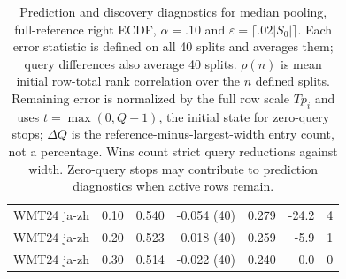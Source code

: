 \begin{table}[t]
\begin{tabular}{lrrrrrr}
WMT24 ja-zh & 0.10 & 0.540 & -0.054 (40) & 0.279 & -24.2 & 4 \\
WMT24 ja-zh & 0.20 & 0.523 & 0.018 (40) & 0.259 & -5.9 & 1 \\
WMT24 ja-zh & 0.30 & 0.514 & -0.022 (40) & 0.240 & 0.0 & 0 \\
\bottomrule
\end{tabular}
\caption{Prediction and discovery diagnostics for median pooling, full-reference right ECDF, $\alpha=.10$ and $\varepsilon=\lceil.02|S_0|\rceil$. Each error statistic is defined on all 40 splits and averages them; query differences also average 40 splits. $\rho(n)$ is mean initial row-total rank correlation over the $n$ defined splits. Remaining error is normalized by the full row scale $Tp_i$ and uses $t=\max(0,Q-1)$, the initial state for zero-query stops; $\Delta Q$ is the reference-minus-largest-width entry count, not a percentage. Wins count strict query reductions against width. Zero-query stops may contribute to prediction diagnostics when active rows remain.}
\label{tab:acquisition-median}
\end{table}
